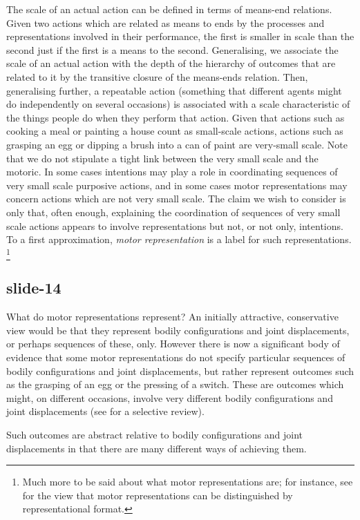 \documentclass[12pt,\papersize]{extarticle}
\begin{document}
The scale of an actual action can be defined in terms of means-end relations.
Given two actions which are related as means to ends by the processes and representations
involved in their performance, the first is smaller in scale than the second just if the
first is a means to the second.  Generalising, we associate the scale of an actual action
with the depth of the hierarchy of outcomes that are related to it by the transitive closure
of the means-ends relation.  Then, generalising further, a repeatable action (something that
different agents might do independently on several occasions) is associated with a scale
characteristic of the things people do when they perform that action.  Given that actions
such as cooking a meal or painting a house count as small-scale actions, actions such as
grasping an egg or dipping a brush into a can of paint are very-small scale.  Note that we
do not stipulate a tight link between the very small scale and the motoric.  In some cases
intentions may play a role in coordinating sequences of very small scale purposive actions,
and in some cases motor representations may concern actions which are not very small scale.
The claim we wish to consider is only that, often enough, explaining the coordination of
sequences of very small scale actions appears to involve representations but not, or not
only, intentions.  To a first approximation, \emph{motor representation} is a label for
such representations.%
\footnote{%
Much more to be said about what motor representations are; for instance, see \citet{butterfill:2012_intention} for the view that motor representations can be distinguished by representational format.
}

\subsection{slide-14}
What do motor representations represent? An initially attractive, conservative
view would be that they represent bodily configurations and joint displacements,
or perhaps sequences of these, only.
However there is now a significant body of evidence that some motor representations
do not specify particular sequences of bodily configurations and joint displacements,
but rather represent outcomes such as the grasping of an egg or the pressing of a switch.
These are outcomes which might, on different occasions, involve very different bodily
configurations and joint displacements
(see \citealp{rizzolatti_functional_2010} for a selective review).

Such outcomes are abstract relative to bodily configurations and joint displacements
in that there are many different ways of achieving them.
\end{document}
